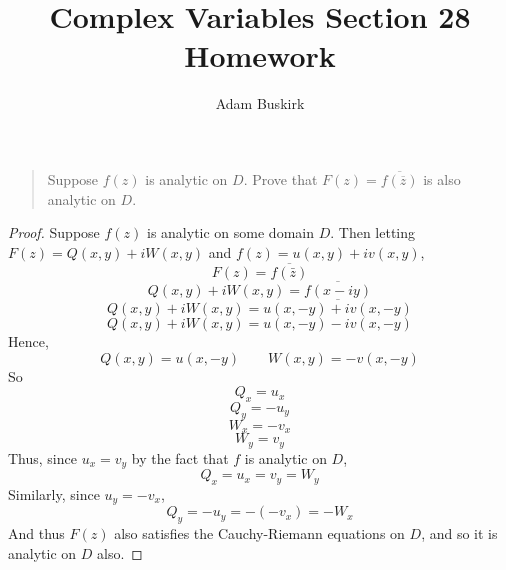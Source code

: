 \documentclass{article}
\title{Complex Variables Section 28 Homework}
\author{Adam Buskirk}
\theoremstyle{definition}
\begin{document}
\maketitle

\begin{quote}
Suppose $f(z)$ is analytic on $D$. Prove that $F(z) = \overline{f(\overline{z})}$
is also analytic on $D$.
\end{quote}
\begin{proof}
Suppose $f(z)$ is analytic on some domain $D$. Then letting
$F(z)=Q(x,y)+iW(x,y)$ and $f(z) = u(x,y)+iv(x,y)$,
\[ 
F(z) = \overline{f(\bar{z})} 
\]
\[
Q(x,y) + i W(x,y) = \overline{f(x-iy)}
\]
\[
Q(x,y) + i W(x,y) = \overline{u(x,-y) + i v(x,-y)}
\]
\[
Q(x,y) + i W(x,y) = u(x,-y) - i v(x,-y)
\]
Hence,
\[
Q(x,y) = u(x,-y)
\qquad
W(x,y) = -v(x,-y)
\]
So
\[ Q_x = u_x \]
\[ Q_y = -u_y \]
\[ W_x = -v_x \]
\[ W_y = v_y \]
Thus, since $u_x=v_y$ by the fact that $f$ is analytic on $D$,
\[ Q_x = u_x = v_y = W_y \]
Similarly, since $u_y = -v_x$,
\[ Q_y = -u_y = -(-v_x) = -W_x \]
And thus $F(z)$ also satisfies the Cauchy-Riemann equations on $D$, and
so it is analytic on $D$ also.
\end{proof}
\end{document}
